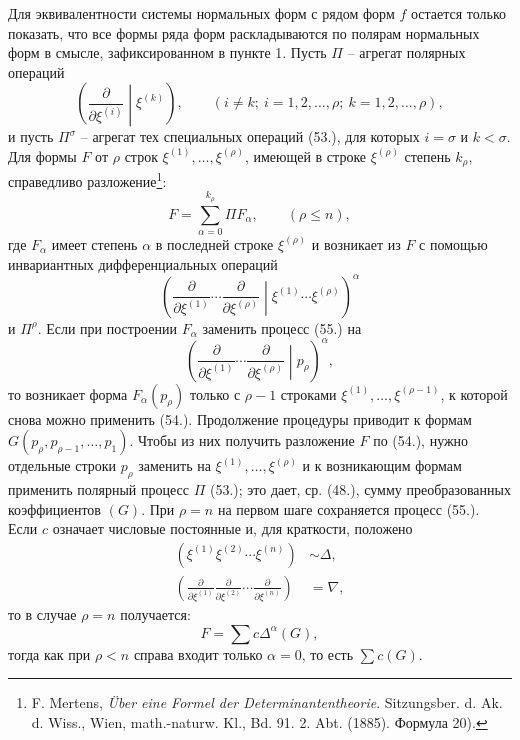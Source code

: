 \documentclass[11pt]{article}
\begin{document}
Для эквивалентности системы нормальных форм с рядом форм $f$ остается только показать, что все формы ряда форм раскладываются по полярам нормальных форм в смысле, зафиксированном в пункте 1. Пусть $\Pi$ -- агрегат полярных операций
\begin{equation}
 \left(\frac{\partial}{\partial\xi^{(i)}}\middle|\xi^{(k)}\right),
 \qquad (i\ne k;\ i=1,2,\ldots,\rho;\ k=1,2,\ldots,\rho),
\tag{53}
\end{equation}
и пусть $\Pi^\sigma$ -- агрегат тех специальных операций (53.), для которых $i=\sigma$ и $k<\sigma$. Для формы $F$ от $\rho$ строк $\xi^{(1)},\ldots,\xi^{(\rho)}$, имеющей в строке $\xi^{(\rho)}$ степень $k_\rho$, справедливо разложение\footnote{F. Mertens, \emph{\"Uber eine Formel der Determinantentheorie}. Sitzungsber. d. Ak. d. Wiss., Wien, math.-naturw. Kl., Bd. 91. 2. Abt. (1885). Формула 20).}:
\begin{equation}
 F=\sum_{\alpha=0}^{k_\rho}\Pi F_\alpha,
 \qquad(\rho\le n),
\tag{54}
\end{equation}
где $F_\alpha$ имеет степень $\alpha$ в последней строке $\xi^{(\rho)}$ и возникает из $F$ с помощью инвариантных дифференциальных операций
\begin{equation}
 \left(\frac{\partial}{\partial\xi^{(1)}}\cdots\frac{\partial}{\partial\xi^{(\rho)}}\middle|\xi^{(1)}\cdots\xi^{(\rho)}\right)^\alpha
\tag{55}
\end{equation}
и $\Pi^\rho$. Если при построении $F_\alpha$ заменить процесс (55.) на
\begin{equation}
 \left(\frac{\partial}{\partial\xi^{(1)}}\cdots\frac{\partial}{\partial\xi^{(\rho)}}\middle|p_\rho\right)^\alpha,
\tag{56}
\end{equation}
то возникает форма $F_\alpha(p_\rho)$ только с $\rho-1$ строками $\xi^{(1)},\ldots,\xi^{(\rho-1)}$, к которой снова можно применить (54.). Продолжение процедуры приводит к формам $G(p_\rho,p_{\rho-1},\ldots,p_1)$. Чтобы из них получить разложение $F$ по (54.), нужно отдельные строки $p_\rho$ заменить на $\xi^{(1)},\ldots,\xi^{(\rho)}$ и к возникающим формам применить полярный процесс $\Pi$ (53.); это дает, ср. (48.), сумму преобразованных коэффициентов $(G)$. При $\rho=n$ на первом шаге сохраняется процесс (55.). Если $c$ означает числовые постоянные и, для краткости, положено
\begin{equation}
\begin{aligned}
(\xi^{(1)}\xi^{(2)}\cdots\xi^{(n)})&\sim\Delta,\\
\left(\frac{\partial}{\partial\xi^{(1)}}\frac{\partial}{\partial\xi^{(2)}}\cdots\frac{\partial}{\partial\xi^{(n)}}\right)&=\nabla,
\end{aligned}
\tag{57}
\end{equation}
то в случае $\rho=n$ получается:
\begin{equation}
 F=\sum c\Delta^\alpha(G),
\tag{58}
\end{equation}
тогда как при $\rho<n$ справа входит только $\alpha=0$, то есть $\sum c(G)$.
\end{document}
